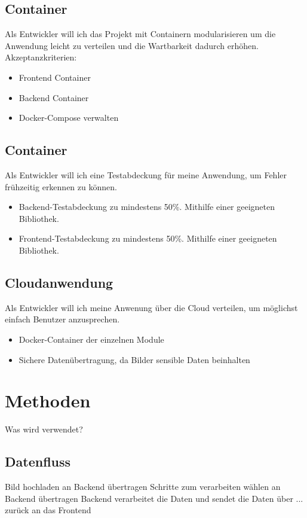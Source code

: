 \documentclass[conference]{IEEEtran}
\begin{document}
\subsection{Container}
Als Entwickler will ich das Projekt mit Containern modularisieren um die Anwendung leicht zu verteilen und die Wartbarkeit dadurch erhöhen.
Akzeptanzkriterien: 
\begin{itemize}
	\item Frontend Container
	\item Backend Container
	\item Docker-Compose verwalten
\end{itemize}

\subsection{Container}
Als Entwickler will ich eine Testabdeckung für meine Anwendung, um Fehler frühzeitig erkennen zu können.
\begin{itemize}
	\item Backend-Testabdeckung zu mindestens 50\%. Mithilfe einer geeigneten Bibliothek.
	\item Frontend-Testabdeckung zu mindestens 50\%. Mithilfe einer geeigneten Bibliothek.
\end{itemize}

\subsection{Cloudanwendung}
Als Entwickler will ich meine Anwenung über die Cloud verteilen, um möglichst einfach Benutzer anzusprechen.
\begin{itemize}
	\item Docker-Container der einzelnen Module
	\item Sichere Datenübertragung, da Bilder sensible Daten beinhalten
\end{itemize}


\section{Methoden}
Was wird verwendet?

\subsection{Datenfluss}
Bild hochladen  an Backend übertragen
Schritte zum verarbeiten wählen an Backend übertragen
Backend verarbeitet die Daten und sendet die Daten über ... zurück an das Frontend
\end{document}

